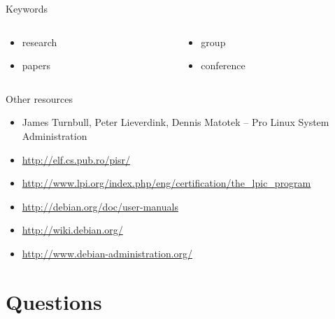 \documentclass{soa.cs.pub.ro}
\begin{document}
\begin{frame}{Keywords}
  \begin{columns}
    \begin{column}[l]{0.5\textwidth}
      \begin{itemize}
        \item research
        \item papers
      \end{itemize}
    \end{column}
    \begin{column}[l]{0.5\textwidth}
      \begin{itemize}
        \item group
        \item conference
      \end{itemize}
    \end{column}
  \end{columns}
\end{frame}

\begin{frame}{Other resources}
  \begin{itemize}
    \item James Turnbull, Peter Lieverdink, Dennis Matotek -- Pro Linux System
    Administration
    \item \url{http://elf.cs.pub.ro/pisr/}
    \item
    \url{http://www.lpi.org/index.php/eng/certification/the_lpic_program}
    \item \url{http://debian.org/doc/user-manuals}
    \item \url{http://wiki.debian.org/}
    \item \url{http://www.debian-administration.org/}
  \end{itemize}
\end{frame}

\section{Questions}
\end{document}
